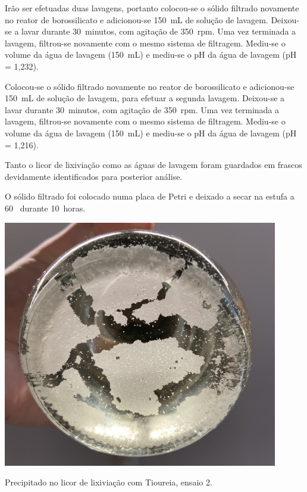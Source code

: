 Irão ser efetuadas duas lavagens, portanto colocou-se o sólido filtrado novamente no reator de borossilicato e adicionou-se 150~mL de solução de lavagem.
Deixou-se a lavar durante 30~minutos, com agitação de 350~rpm.
Uma vez terminada a lavagem, filtrou-se novamente com o mesmo sistema de filtragem.
Mediu-se o volume da água de lavagem (150~mL) e mediu-se o pH da água de lavagem (pH = 1,232).


Colocou-se o sólido filtrado novamente no reator de borossilicato e adicionou-se 150~mL de solução de lavagem, para efetuar a segunda lavagem.
Deixou-se a lavar durante 30~minutos, com agitação de 350~rpm.
Uma vez terminada a lavagem, filtrou-se novamente com o mesmo sistema de filtragem.
Mediu-se o volume da água de lavagem (150~mL) e mediu-se o pH da água de lavagem (pH = 1,216).


Tanto o licor de lixiviação como as águas de lavagem foram guardados em frascos devidamente identificados para posterior análise.

O sólido filtrado foi colocado numa placa de Petri e deixado a secar na estufa a 60~\graus{} durante 10~horas.

\begin{marginfigure}[\baselineskip]
    \centering
    \includegraphics[width=0.9\textwidth]{figures/Precipitado Toureia}
    \caption{Precipitado no licor de lixiviação com Tioureia, ensaio 2.}
    \label{fig:precipitado-lix-tioureia}
\end{marginfigure}

